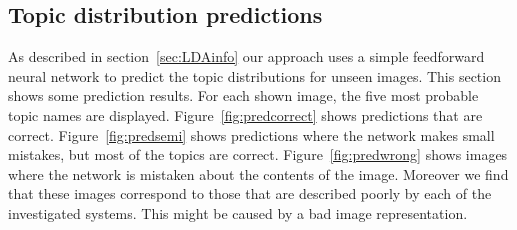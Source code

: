 \documentclass[twoside,twocolumn]{article}
\begin{document}
	\subsection{Topic distribution predictions}
	As described in section~\ref{sec:LDAinfo} our approach uses a simple feedforward neural network to predict the topic distributions for unseen images. This section shows some prediction results. For each shown image, the five most probable topic names are displayed. Figure~\ref{fig:predcorrect} shows predictions that are correct. Figure~\ref{fig:predsemi} shows predictions where the network makes small mistakes, but most of the topics are correct. Figure~\ref{fig:predwrong} shows images where the network is mistaken about the contents of the image. Moreover we find that these images correspond to those that are described poorly by each of the investigated systems. This might be caused by a bad image representation.
	
\end{document}
